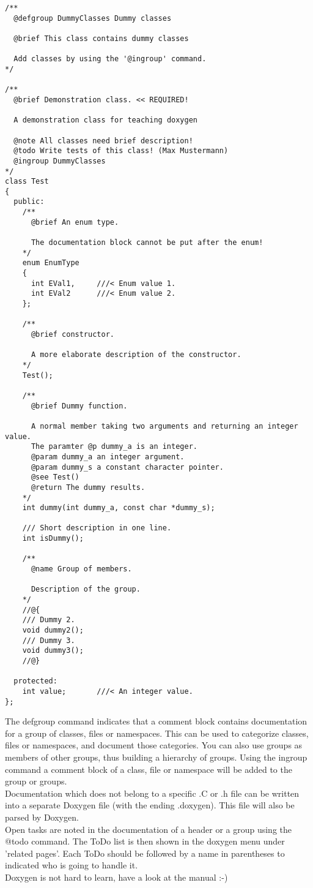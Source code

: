 \documentclass[a4]{article}
\begin{document}
\begin{verbatim}
/**
  @defgroup DummyClasses Dummy classes
	
  @brief This class contains dummy classes
	
  Add classes by using the '@ingroup' command. 
*/

/**
  @brief Demonstration class. << REQUIRED!
  
  A demonstration class for teaching doxygen
  
  @note All classes need brief description!
  @todo Write tests of this class! (Max Mustermann)
  @ingroup DummyClasses
*/
class Test
{
  public:
    /** 
      @brief An enum type. 
      
      The documentation block cannot be put after the enum! 
    */
    enum EnumType
    {
      int EVal1,     ///< Enum value 1.
      int EVal2      ///< Enum value 2.
    };
    
    /**
      @brief constructor.
      
      A more elaborate description of the constructor.
    */
    Test();

    /** 
      @brief Dummy function.
      
      A normal member taking two arguments and returning an integer value.
      The paramter @p dummy_a is an integer.
      @param dummy_a an integer argument.
      @param dummy_s a constant character pointer.
      @see Test()
      @return The dummy results.
    */
    int dummy(int dummy_a, const char *dummy_s);
    
    /// Short description in one line.
    int isDummy();

    /** 
      @name Group of members.
      
      Description of the group.
    */
    //@{
    /// Dummy 2.
    void dummy2();
    /// Dummy 3.
    void dummy3();
    //@}
    
  protected:
    int value;       ///< An integer value.
};
\end{verbatim}
The defgroup command indicates that a comment block contains documentation for a group of classes, files or namespaces.
This can be used to categorize classes, files or namespaces, and document those categories. 
You can also use groups as members of other groups, thus building a hierarchy of groups. 
Using the ingroup command a comment block of a class, file or namespace will be added to the group or groups.\\
Documentation which does not belong to a specific .C or .h file can be written into a 
separate Doxygen file (with the ending .doxygen). This file will also be parsed by Doxygen.\\
Open tasks are noted in the documentation of a header or a group using the @todo command.
The ToDo list is then shown in the doxygen menu under 'related pages'. Each ToDo should be
followed by a name in parentheses to indicated who is going to handle it.\\
Doxygen is not hard to learn, have a look at the manual :-)
\end{document}
